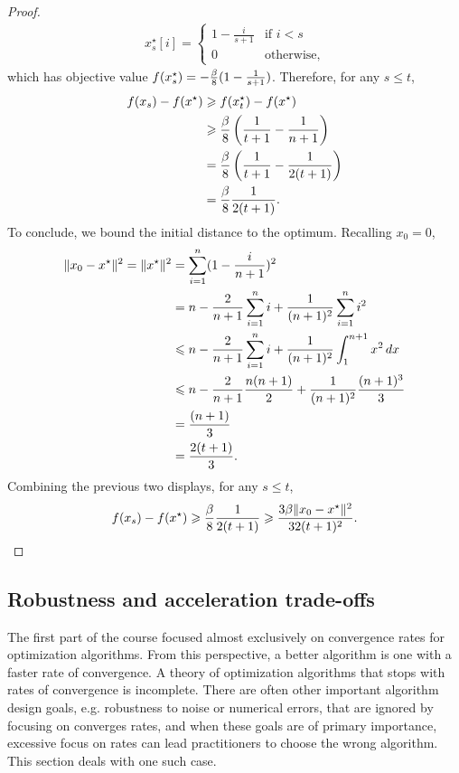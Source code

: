 \begin{proof}
\begin{align*}
    x_s^\star[i] = 
    \begin{cases}
        1- \frac{i}{s + 1} &\text{if } i < s \\
        0 &\text{otherwise},
    \end{cases}
\end{align*}
which has objective value $f(x_s^\star) = -\frac{\beta}{8}(1 - \frac{1}{s + 1} )$.
Therefore, for any $s \leq t$,
\begin{align*}
    f(x_s) - f(x^\star) 
    &\geqslant f(x_t^\star) - f(x^\star) \\
    &\geqslant \frac{\beta}{8} \left(\frac{1}{t+1} - \frac{1}{n+1} \right ) \\
    &= \frac{\beta}{8} \left(\frac{1}{t+1} - \frac{1}{2(t+1)} \right ) \\
    &= \frac{\beta}{8}\frac{1}{2(t+1)}.
\end{align*}
To conclude, we bound the initial distance to the optimum. Recalling $x_0 = 0$,
\begin{align*}
    \lVert x_0 - x^\star\rVert^2 =
    \lVert x^\star\rVert^2 
    &= \sum_{i=1}^n (1 - \frac{i}{n+1} )^2  \\
    &= n - \frac{2}{n+1} \sum_{i=1}^n i + \frac{1}{(n+1)^2} \sum_{i=1}^{n} i^2 \\
    &\leqslant n - \frac{2}{n+1} \sum_{i=1}^n i + \frac{1}{(n+1)^2} \int_1^{n+1} x^2 \, dx \\
    &\leqslant n - \frac{2}{n+1}\frac{n(n+1)}{2} + \frac{1}{(n+1)^2} \frac{(n+1)^3}{3} \\
    &= \frac{(n+1)}{3} \\
    &= \frac{2(t+1)}{3}.
\end{align*}
Combining the previous two displays, for any $s \leq t$,
\begin{align*}
    f(x_s) - f(x^\star)
    \geqslant \frac{\beta}{8}\frac{1}{2(t+1)} 
    \geqslant \frac{3 \beta\lVert x_0 - x^\star\rVert^2}{32(t+1)^2}.
\end{align*}
\end{proof}

\subsection{Robustness and acceleration trade-offs}
The first part of the course focused almost exclusively on
convergence rates for optimization algorithms. From this
perspective, a better algorithm is one with a faster rate of convergence.
A theory of optimization algorithms that stops with rates of
convergence is incomplete. There are often other important algorithm design
goals, e.g. robustness to noise or numerical errors, that are ignored by
focusing on converges rates, and when these goals are of primary importance, 
excessive focus on rates can lead practitioners to choose the wrong algorithm.
This section deals with one such case.

